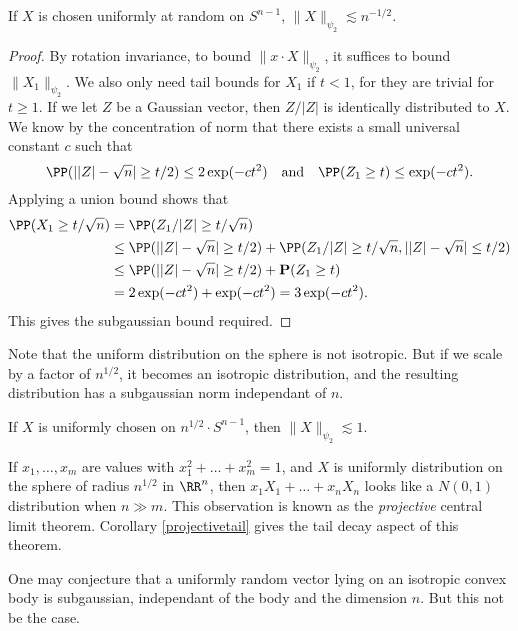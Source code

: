 \begin{theorem}
    If $X$ is chosen uniformly at random on $S^{n-1}$, $\| X \|_{\psi_2} \lesssim n^{-1/2}$.
\end{theorem}
\begin{proof}
    By rotation invariance, to bound $\| x \cdot X \|_{\psi_2}$, it suffices to bound $\| X_1 \|_{\psi_2}$. We also only need tail bounds for $X_1$ if $t < 1$, for they are trivial for $t \geq 1$. If we let $Z$ be a Gaussian vector, then $Z/|Z|$ is identically distributed to $X$. We know by the concentration of norm that there exists a small universal constant $c$ such that
    \[ \PP(||Z| - \sqrt{n}| \geq t/2) \leq 2\exp(-ct^2)\quad\text{and}\quad \PP(Z_1 \geq t) \leq \exp(-ct^2). \]
    Applying a union bound shows that
    \begin{align*}
        \PP(X_1 \geq t/\sqrt{n}) &= \PP(Z_1/|Z| \geq t/\sqrt{n})\\
        &\leq \PP(||Z| - \sqrt{n}| \geq t/2) + \PP(Z_1/|Z| \geq t/\sqrt{n}, ||Z| - \sqrt{n}| \leq t/2)\\
        &\leq \PP(||Z| - \sqrt{n}| \geq t/2) + \mathbf{P}(Z_1 \geq t)\\
        &= 2 \exp(-ct^2) + \exp(-ct^2) = 3\exp(-ct^2).
    \end{align*}
    This gives the subgaussian bound required.
\end{proof}

Note that the uniform distribution on the sphere is not isotropic. But if we scale by a factor of $n^{1/2}$, it becomes an isotropic distribution, and the resulting distribution has a subgaussian norm independant of $n$.

\begin{corollary} \label{projectivetail}
    If $X$ is uniformly chosen on $n^{1/2} \cdot S^{n-1}$, then $\| X \|_{\psi_2} \lesssim 1$.
\end{corollary}

If $x_1, \dots, x_m$ are values with $x_1^2 + \dots + x_m^2 = 1$, and $X$ is uniformly distribution on the sphere of radius $n^{1/2}$ in $\RR^n$, then $x_1 X_1 + \dots + x_n X_n$ looks like a $N(0,1)$ distribution when $n \gg m$. This observation is known as the \emph{projective} central limit theorem. Corollary \ref{projectivetail} gives the tail decay aspect of this theorem.

One may conjecture that a uniformly random vector lying on an isotropic convex body is subgaussian, independant of the body and the dimension $n$. But this not be the case.


